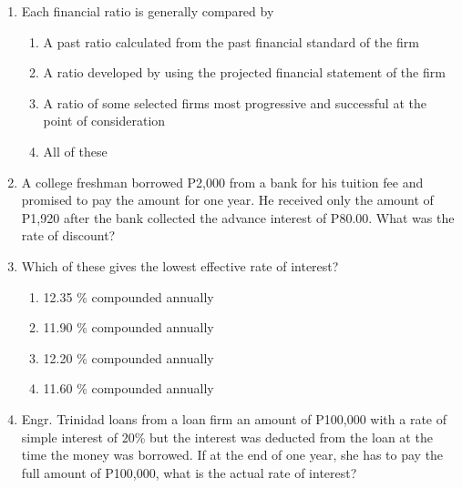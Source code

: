 \documentclass[11pt,a4paper]{article}
\begin{document}
\begin{enumerate}
\item{Each financial ratio is generally compared by}
\begin{enumerate}[label=\Alph*.]
\item{A past ratio calculated from the past financial standard of the firm}
\item{A ratio developed by using the projected financial statement of the firm}
\item{A ratio of some selected firms most progressive and successful at the point of consideration}
\item{All of these}
\end{enumerate}
\item{A college freshman borrowed P2,000 from a bank for his tuition fee and promised to pay the amount for one year. He received only the amount of P1,920 after the bank collected the advance interest of P80.00. What was the rate of discount?}
\\
\item{Which of these gives the lowest effective rate of interest?}
\begin{enumerate}[label=\Alph*.]
\item{12.35 \% compounded annually}
\item{11.90 \% compounded annually}
\item{12.20 \% compounded annually}
\item{11.60 \% compounded annually}
\end{enumerate}
\item{Engr. Trinidad loans from a loan firm an amount of P100,000 with a rate of simple interest of 20\% but the interest was deducted from the loan at the time the money was borrowed. If at the end of one year, she has to pay the full amount of P100,000, what is the actual rate of interest?}
\\\begin{enumerate*}[itemjoin=\qquad, label=\Alph*.]

\end{enumerate*}
\end{enumerate}
\end{document}
